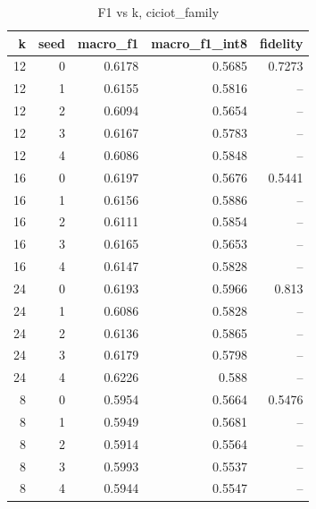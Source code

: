 \begin{table}
\caption{F1 vs k, ciciot_family}
\begin{tabular}{rrrrr}
\toprule
k & seed & macro_f1 & macro_f1_int8 & fidelity \\
\midrule
12 & 0 & 0.6178 & 0.5685 & 0.7273 \\
12 & 1 & 0.6155 & 0.5816 & -- \\
12 & 2 & 0.6094 & 0.5654 & -- \\
12 & 3 & 0.6167 & 0.5783 & -- \\
12 & 4 & 0.6086 & 0.5848 & -- \\
16 & 0 & 0.6197 & 0.5676 & 0.5441 \\
16 & 1 & 0.6156 & 0.5886 & -- \\
16 & 2 & 0.6111 & 0.5854 & -- \\
16 & 3 & 0.6165 & 0.5653 & -- \\
16 & 4 & 0.6147 & 0.5828 & -- \\
24 & 0 & 0.6193 & 0.5966 & 0.813 \\
24 & 1 & 0.6086 & 0.5828 & -- \\
24 & 2 & 0.6136 & 0.5865 & -- \\
24 & 3 & 0.6179 & 0.5798 & -- \\
24 & 4 & 0.6226 & 0.588 & -- \\
8 & 0 & 0.5954 & 0.5664 & 0.5476 \\
8 & 1 & 0.5949 & 0.5681 & -- \\
8 & 2 & 0.5914 & 0.5564 & -- \\
8 & 3 & 0.5993 & 0.5537 & -- \\
8 & 4 & 0.5944 & 0.5547 & -- \\
\bottomrule
\end{tabular}
\end{table}

